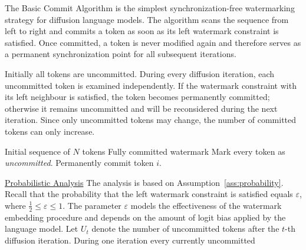 \documentclass[a4paper,11pt]{llncs}
\begin{document}
The Basic Commit Algorithm is the simplest synchronization-free
watermarking strategy for diffusion language models. The algorithm scans
the sequence from left to right and commits a token as soon as its left
watermark constraint is satisfied. Once committed, a token is never
modified again and therefore serves as a permanent synchronization point
for all subsequent iterations.

Initially all tokens are uncommitted. During every diffusion iteration,
each uncommitted token is examined independently. If the watermark
constraint with its left neighbour is satisfied, the token becomes
permanently committed; otherwise it remains uncommitted and will be
reconsidered during the next iteration. Since only uncommitted tokens may
change, the number of committed tokens can only increase.
%
%
\begin{algorithm}[H]
\caption{Basic Commit Algorithm}
\label{alg:basic}
\begin{algorithmic}[1]
\Require Initial sequence of $N$ tokens
\Ensure Fully committed watermark
\State Mark every token as \emph{uncommitted}.
\Repeat
{}
\State Permanently commit token $i$.
\EndIf
\EndIf
\EndFor
{}
\end{algorithmic}
\end{algorithm}
%
\noindent
\underline{Probabilistic Analysis}
The analysis is based on Assumption~\ref{ass:probability}. Recall that
the probability that the left watermark constraint is satisfied equals
$\varepsilon$, where $\frac12\le\varepsilon\le1$. The parameter
$\varepsilon$ models the effectiveness of the watermark embedding
procedure and depends on the amount of logit bias applied by the language
model.
%
Let $U_t$ denote the number of uncommitted tokens after the $t$-th
diffusion iteration. During one iteration every currently uncommitted
\end{document}
